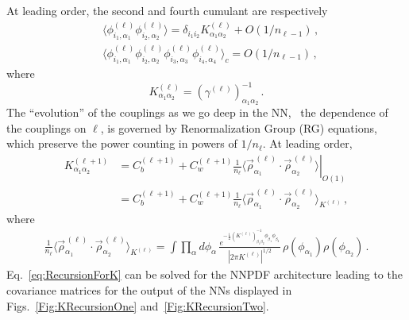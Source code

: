 \documentclass[11pt]{article}
\begin{document}
At leading order, the second and fourth cumulant are respectively
\begin{align}
    &\langle \phi^{(\ell)}_{i_1,\alpha_1} \phi^{(\ell)}_{i_2,\alpha_2}\rangle
      = \delta_{i_1 i_2} K^{(\ell)}_{\alpha_1\alpha_2} + O(1/n_{\ell-1})\, , \\
    &\langle \phi^{(\ell)}_{i_1,\alpha_1} \phi^{(\ell)}_{i_2,\alpha_2}
      \phi^{(\ell)}_{i_3,\alpha_3} \phi^{(\ell)}_{i_4,\alpha_4}\rangle_c
      = O(1/n_{\ell-1})\, ,
\end{align}
where
\begin{equation}
    \label{eq:DefineKmat}
    K^{(\ell)}_{\alpha_1\alpha_2} = \left(\gamma^{(\ell)}\right)^{-1}_{\alpha_1\alpha_2}\, .
\end{equation}
The ``evolution'' of the couplings as we go deep in the NN, \ie\ the dependence of the couplings on
$\ell$, is governed by Renormalization Group (RG) equations, which preserve the power counting in
powers of $1/n_{\ell}$. At leading order,
\begin{align}
    K^{(\ell+1)}_{\alpha_1\alpha_2} &=
      \left.
      C_b^{(\ell+1)} + C_w^{(\ell+1)} \frac{1}{n_\ell}
      \langle \vec{\rho}^{\,(\ell)}_{\alpha_1} \cdot
      \vec{\rho}^{\,(\ell)}_{\alpha_2} \rangle
      \right|_{O(1)} \\
      \label{eq:RecursionForK}
      &= C_b^{(\ell+1)} + C_w^{(\ell+1)} \frac{1}{n_\ell}
      \langle \vec{\rho}^{\,(\ell)}_{\alpha_1} \cdot
      \vec{\rho}^{\,(\ell)}_{\alpha_2} \rangle_{K^{(\ell)}}\, ,
\end{align}
where
\begin{align*}
    \frac{1}{n_\ell}
      \langle \vec{\rho}^{\,(\ell)}_{\alpha_1} \cdot
      \vec{\rho}^{\,(\ell)}_{\alpha_2} \rangle_{K^{(\ell)}} =
    \int \prod_{\alpha}d\phi_\alpha\,
      \frac{e^{-\frac12 \left(K^{(\ell)}\right)^{-1}_{\beta_1\beta_2}
        \phi_{\beta_1} \phi_{\beta_2}}}
        {\left|2\pi K^{(\ell)}\right|^{1/2}}\,
        \rho(\phi_{\alpha_1}) \rho(\phi_{\alpha_2})\, .
\end{align*}
Eq.~\eqref{eq:RecursionForK} can be solved for the NNPDF architecture leading to the
covariance matrices for the output of the NNs displayed in
Figs.~\ref{Fig:KRecursionOne} and~\ref{Fig:KRecursionTwo}.
\end{document}

